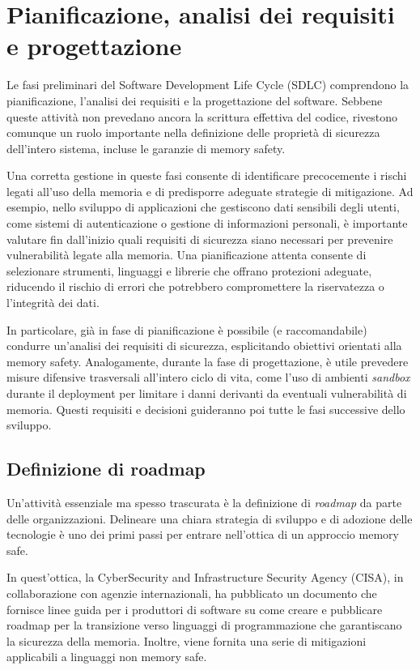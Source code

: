 \section{Pianificazione, analisi dei requisiti e progettazione}
\label{sec:planning_requirements_design}

Le fasi preliminari del Software Development Life Cycle (SDLC) comprendono la pianificazione,
l'analisi dei requisiti e la progettazione del software. Sebbene queste attività
non prevedano ancora la scrittura effettiva del codice, rivestono comunque un
ruolo importante nella definizione delle proprietà di sicurezza dell'intero
sistema, incluse le garanzie di memory safety.

Una corretta gestione in queste fasi consente di identificare precocemente i rischi
legati all'uso della memoria e di predisporre adeguate strategie di mitigazione.
Ad esempio, nello sviluppo di applicazioni che gestiscono dati sensibili degli utenti,
come sistemi di autenticazione o gestione di informazioni personali, è importante
valutare fin dall'inizio quali requisiti di sicurezza siano necessari per prevenire
vulnerabilità legate alla memoria. Una pianificazione attenta consente di
selezionare strumenti, linguaggi e librerie che offrano protezioni adeguate,
riducendo il rischio di errori che potrebbero compromettere la riservatezza o l'integrità
dei dati.

In particolare, già in fase di pianificazione è possibile (e raccomandabile) condurre
un'analisi dei requisiti di sicurezza, esplicitando obiettivi orientati alla
memory safety. Analogamente, durante la fase di progettazione, è utile prevedere
misure difensive trasversali all'intero ciclo di vita, come l'uso di ambienti
\textit{sandbox} durante il deployment per limitare i danni derivanti da eventuali
vulnerabilità di memoria. Questi requisiti e decisioni guideranno poi tutte le
fasi successive dello sviluppo.

\subsection{Definizione di roadmap}
\label{sec:roadmap} Un'attività essenziale ma spesso trascurata è la definizione
di \textit{roadmap} da parte delle organizzazioni. Delineare una chiara
strategia di sviluppo e di adozione delle tecnologie è uno dei primi passi per
entrare nell'ottica di un approccio memory safe.

In quest'ottica, la CyberSecurity and Infrastructure Security Agency (CISA), in
collaborazione con agenzie internazionali, ha pubblicato un documento\cite{memory_safe_roadmaps}
che fornisce linee guida per i produttori di software su come creare e
pubblicare roadmap per la transizione verso linguaggi di programmazione che
garantiscano la sicurezza della memoria. Inoltre, viene fornita una serie di
mitigazioni applicabili a linguaggi non memory safe.

